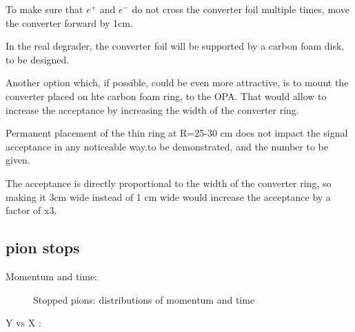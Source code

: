 To make sure that $e^+$ and $e^-$ do not cross the converter foil multiple times,
move the converter forward by 1cm.

In the real degrader, the converter foil will be supported by a carbon foam disk,
to be designed.

Another option which, if possible, could be even more attractive, is to mount
the converter placed on hte carbon foam ring, to the OPA.
That would allow to increase the acceptance by increasing the width
of the converter ring.

Permanent placement of the thin ring at R=25-30 cm does not impact the signal acceptance
in any noticeable way.{\red to be demonstrated, and the number to be given}.

The acceptance is directly proportional to the width of the converter ring,
so making it 3cm wide instead of 1 cm wide would increase the acceptance
by a factor of x3.

\subsection{pion stops}

Momentum and time:

\begin{figure}[H]
  \caption{
    \label{figure:sum_mom_vd13}
    Stopped pions: distributions of momentum and time
  }
\end{figure}


Y vs X :

